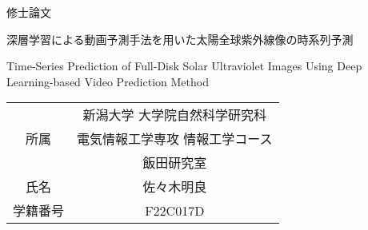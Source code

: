 \thispagestyle{empty} %

\begin{center}

    \vspace{2cm}
    
    {\Huge 修士論文}
    
    \vspace{2cm}
    
    {\LARGE 深層学習による動画予測手法を用いた太陽全球紫外線像の時系列予測}
    
    \vspace{1cm}
    
    {\Large Time-Series Prediction of Full-Disk Solar Ultraviolet Images Using Deep Learning-based Video Prediction Method}
    
    \vspace{3cm}
    
    \Large
    \begin{tabular}{|c|c|}
      \hline
      \multirow{3}{*}{所属} & 新潟大学 大学院自然科学研究科\\ &  電気情報工学専攻 情報工学コース \\ & 飯田研究室 \\
      \hline
      氏名 &  佐々木明良\\
      \hline
      学籍番号 & F22C017D\\
      \hline
    \end{tabular}
\end{center}

\clearpage %

